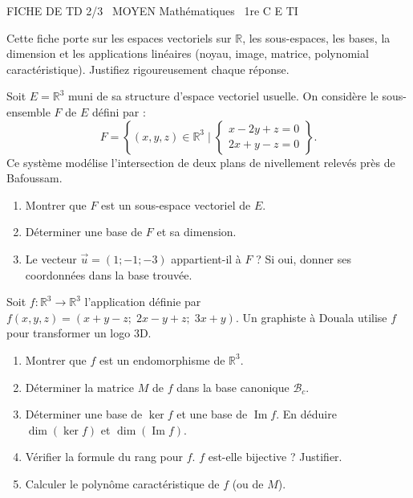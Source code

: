 \documentclass[11pt]{article}
\begin{document}
\begin{tcolorbox}[enhanced,colback=popink,colframe=popink,arc=10pt,boxrule=0pt,left=12pt,right=12pt,top=9pt,bottom=9pt]
{\color{white}\popxbold\small FICHE DE TD 2/3 \textbullet\ MOYEN \hfill Mathématiques \textbullet\ 1re C E TI\par}
\end{tcolorbox}
\vspace{4pt}
\noindent Cette fiche porte sur les espaces vectoriels sur $\mathbb{R}$, les sous-espaces, les bases, la dimension et les applications linéaires (noyau, image, matrice, polynomial caractéristique). Justifiez rigoureusement chaque réponse.

\begin{exercice}
Soit $E = \mathbb{R}^3$ muni de sa structure d'espace vectoriel usuelle. On considère le sous-ensemble $F$ de $E$ défini par :
$$F = \left\{ (x,y,z) \in \mathbb{R}^3 \mid \begin{cases} x - 2y + z = 0 \\ 2x + y - z = 0 \end{cases} \right\}.$$
Ce système modélise l'intersection de deux plans de nivellement relevés près de Bafoussam.
\begin{enumerate}
    \item Montrer que $F$ est un sous-espace vectoriel de $E$.
    \item Déterminer une base de $F$ et sa dimension.
    \item Le vecteur $\vec{u} = (1; -1; -3)$ appartient-il à $F$ ? Si oui, donner ses coordonnées dans la base trouvée.
\end{enumerate}
\end{exercice}

\begin{exercice}
Soit $f : \mathbb{R}^3 \to \mathbb{R}^3$ l'application définie par $f(x,y,z) = (x+y-z;\; 2x-y+z;\; 3x+y)$.
Un graphiste à Douala utilise $f$ pour transformer un logo 3D.
\begin{enumerate}
    \item Montrer que $f$ est un endomorphisme de $\mathbb{R}^3$.
    \item Déterminer la matrice $M$ de $f$ dans la base canonique $\mathcal{B}_c$.
    \item Déterminer une base de $\ker f$ et une base de $\operatorname{Im} f$. En déduire $\dim(\ker f)$ et $\dim(\operatorname{Im} f)$.
    \item Vérifier la formule du rang pour $f$. $f$ est-elle bijective ? Justifier.
    \item Calculer le polynôme caractéristique de $f$ (ou de $M$).
\end{enumerate}
\end{exercice}
\end{document}
